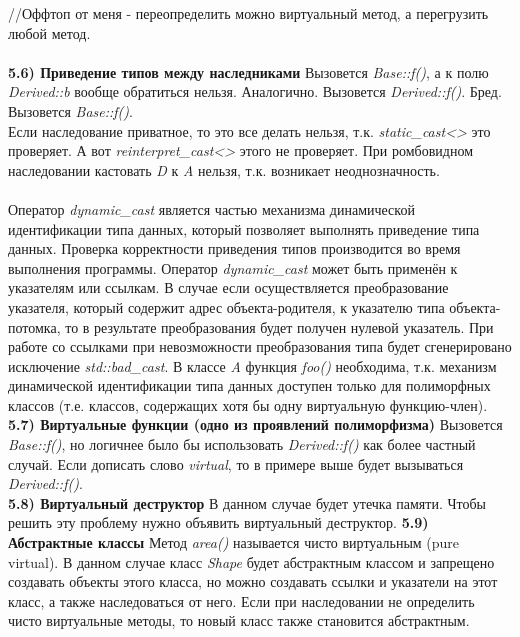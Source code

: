 \documentclass{article}
\begin{document}
\noindent//Оффтоп от меня - переопределить можно виртуальный метод, а перегрузить любой метод.\\\\
\noindent \textbf{5.6) Приведение типов между наследниками}
Вызовется \textit{Base::f()}, а к полю \textit{Derived::b} вообще обратиться нельзя.
Аналогично.
Вызовется \textit{Derived::f()}.
Бред.
Вызовется \textit{Base::f()}.\\
Если наследование приватное, то это все делать нельзя, т.к. \textit{static\_cast<>} это проверяет.
А вот \textit{reinterpret\_cast<>} этого не проверяет.
При ромбовидном наследовании кастовать \textit{D} к \textit{A} нельзя, т.к. возникает неоднозначность.\\\\
Оператор \textit{dynamic\_cast} является частью механизма динамической идентификации типа данных, который позволяет выполнять приведение типа данных. Проверка корректности приведения типов производится во время выполнения программы. Оператор \textit{dynamic\_cast} может быть применён к указателям или ссылкам. В случае если осуществляется преобразование указателя, который содержит адрес объекта-родителя, к указателю типа объекта-потомка, то в результате преобразования будет получен нулевой указатель. При работе со ссылками при невозможности преобразования типа будет сгенерировано исключение \textit{std::bad\_cast}.
В классе \textit{A} функция \textit{foo()} необходима, т.к. механизм динамической идентификации типа данных доступен только для полиморфных классов (т.е. классов, содержащих хотя бы одну виртуальную функцию-член).\\
\noindent \textbf{5.7) Виртуальные функции (одно из проявлений полиморфизма)}
Вызовется \textit{Base::f()}, но логичнее было бы использовать \textit{Derived::f()} как более частный случай.
Если дописать слово \textit{virtual}, то в примере выше будет вызываться \textit{Derived::f()}.\\
\noindent \textbf{5.8) Виртуальный деструктор}
В данном случае будет утечка памяти. Чтобы решить эту проблему нужно объявить виртуальный деструктор.
\noindent \textbf{5.9) Абстрактные классы}
Метод \textit{area()} называется чисто виртуальным (pure virtual). В данном случае класс \textit{Shape} будет абстрактным классом и запрещено создавать объекты этого класса, но можно создавать ссылки и указатели на этот класс, а также наследоваться от него. Если при наследовании не определить чисто виртуальные методы, то новый класс также становится абстрактным.
\end{document}
